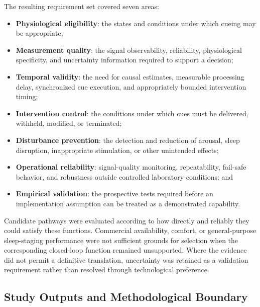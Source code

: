 The resulting requirement set covered seven areas:

\begin{itemize}
    \item \textbf{Physiological eligibility}: the states and conditions under
    which cueing may be appropriate;

    \item \textbf{Measurement quality}: the signal observability, reliability,
    physiological specificity, and uncertainty information required to support
    a decision;

    \item \textbf{Temporal validity}: the need for causal estimates, measurable
    processing delay, synchronized cue execution, and appropriately bounded
    intervention timing;

    \item \textbf{Intervention control}: the conditions under which cues must be
    delivered, withheld, modified, or terminated;

    \item \textbf{Disturbance prevention}: the detection and reduction of
    arousal, sleep disruption, inappropriate stimulation, or other unintended
    effects;

    \item \textbf{Operational reliability}: signal-quality monitoring,
    repeatability, fail-safe behavior, and robustness outside controlled
    laboratory conditions; and

    \item \textbf{Empirical validation}: the prospective tests required before
    an implementation assumption can be treated as a demonstrated capability.
\end{itemize}

Candidate pathways were evaluated according to how directly and reliably they
could satisfy these functions. Commercial availability, comfort, or
general-purpose sleep-staging performance were not sufficient grounds for
selection when the corresponding closed-loop function remained unsupported.
Where the evidence did not permit a definitive translation, uncertainty was
retained as a validation requirement rather than resolved through technological
preference.


\subsection{Study Outputs and Methodological Boundary}

